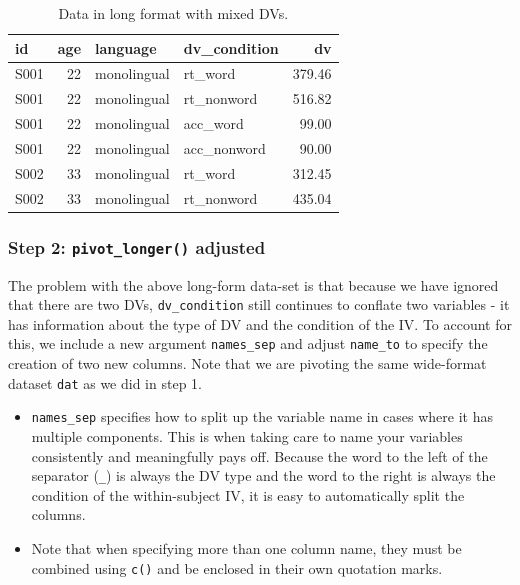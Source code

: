 \documentclass[
  english,
  doc,floatsintext]{apa6}
\begin{document}
\begin{table}

\caption{\label{tab:long1-example}Data in long format with mixed DVs.}
\centering
\begin{tabular}[t]{l|r|l|l|r}
\hline
id & age & language & dv\_condition & dv\\
\hline
S001 & 22 & monolingual & rt\_word & 379.46\\
\hline
S001 & 22 & monolingual & rt\_nonword & 516.82\\
\hline
S001 & 22 & monolingual & acc\_word & 99.00\\
\hline
S001 & 22 & monolingual & acc\_nonword & 90.00\\
\hline
S002 & 33 & monolingual & rt\_word & 312.45\\
\hline
S002 & 33 & monolingual & rt\_nonword & 435.04\\
\hline
\end{tabular}
\end{table}

\hypertarget{step-2-pivot_longer-adjusted}{%
\subsubsection{\texorpdfstring{Step 2: \texttt{pivot\_longer()} adjusted}{Step 2: pivot\_longer() adjusted}}\label{step-2-pivot_longer-adjusted}}

The problem with the above long-form data-set is that because we have ignored that there are two DVs, \texttt{dv\_condition} still continues to conflate two variables - it has information about the type of DV and the condition of the IV. To account for this, we include a new argument \texttt{names\_sep} and adjust \texttt{name\_to} to specify the creation of two new columns. Note that we are pivoting the same wide-format dataset \texttt{dat} as we did in step 1.

\begin{itemize}
\item
  \texttt{names\_sep} specifies how to split up the variable name in cases where it has multiple components. This is when taking care to name your variables consistently and meaningfully pays off. Because the word to the left of the separator (\texttt{\_}) is always the DV type and the word to the right is always the condition of the within-subject IV, it is easy to automatically split the columns.
\item
  Note that when specifying more than one column name, they must be combined using \texttt{c()} and be enclosed in their own quotation marks.
\end{itemize}
\end{document}
